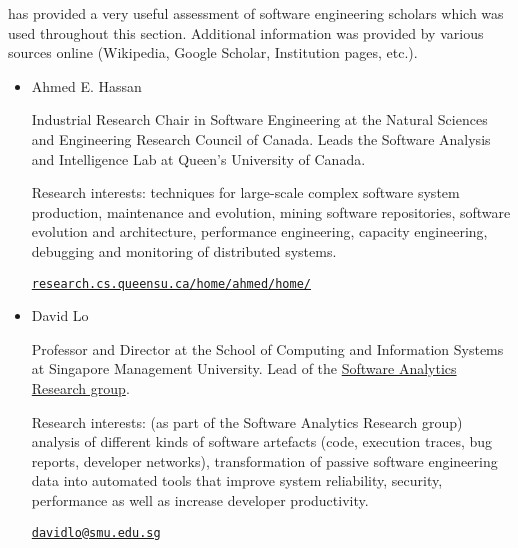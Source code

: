 \documentclass[a4paper]{article}
\begin{document}
            \cite{wong2021bibliometric} has provided a very useful assessment of software engineering scholars which was used throughout this section. Additional information was provided by various sources online (Wikipedia, Google Scholar, Institution pages, etc.).

            \begin{itemize}
                \item
                Ahmed E. Hassan
                
                Industrial Research Chair in Software Engineering at the Natural Sciences and Engineering Research Council of Canada. Leads the Software Analysis and Intelligence Lab at Queen's University of Canada.

                Research interests: techniques for large-scale complex software system production, maintenance and evolution, mining software repositories, software evolution and architecture, performance engineering, capacity engineering, debugging and monitoring of distributed systems.

                \href{https://research.cs.queensu.ca/home/ahmed/home/}{\texttt{research.cs.queensu.ca/home/ahmed/home/}}


                \item 
                David Lo
                
                Professor and Director at the School of Computing and Information Systems at Singapore Management University. Lead of the \href{https://soarsmu.github.io/}{Software Analytics Research group}.

                Research interests: (as part of the Software Analytics Research group) analysis of different kinds of software artefacts (code, execution traces, bug reports, developer networks), transformation of passive software engineering data into automated tools that improve system reliability, security, performance as well as increase developer productivity.

                \href{mailto:davidlo@smu.edu.sg}{\texttt{davidlo@smu.edu.sg}}



\end{itemize}
\end{document}
